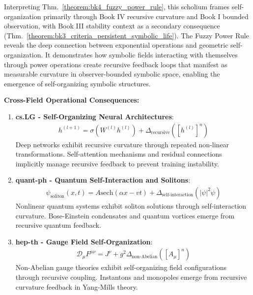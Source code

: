 \begin{scholium}
\label{scholium:bk4_symbolic_self_organization}
Interpreting Thm.~\ref{theorem:bk4_fuzzy_power_rule}, this scholium frames self-organization primarily through Book IV recursive curvature and Book I bounded observation, with Book III stability context as a secondary consequence (Thm.~\ref{theorem:bk3_criteria_persistent_symbolic_life}).
The Fuzzy Power Rule reveals the deep connection between exponential operations and geometric self-organization. It demonstrates how symbolic fields interacting with themselves through power operations create recursive feedback loops that manifest as measurable curvature in observer-bounded symbolic space, enabling the emergence of self-organizing symbolic structures.

\textbf{Cross-Field Operational Consequences:}

\begin{enumerate}
\item \textbf{cs.LG - Self-Organizing Neural Architectures}: 
   \begin{align}
   h^{(l+1)} = \sigma(W^{(l)} h^{(l)}) + \Delta_{\text{recursive}}([h^{(l)}]^n)
   \end{align}
   Deep networks exhibit recursive curvature through repeated non-linear transformations. Self-attention mechanisms and residual connections implicitly manage recursive feedback to prevent training instability.

\item \textbf{quant-ph - Quantum Self-Interaction and Solitons}:
   \begin{align}
   \psi_{\text{soliton}}(x,t) = A \text{sech}(\alpha x - vt) + \Delta_{\text{self-interaction}}(|\psi|^2\psi)
   \end{align}
   Nonlinear quantum systems exhibit soliton solutions through self-interaction curvature. Bose-Einstein condensates and quantum vortices emerge from recursive quantum feedback.

\item \textbf{hep-th - Gauge Field Self-Organization}:
   \begin{align}
   \mathcal{D}_\mu F^{\mu\nu} = J^\nu + g^2 \Delta_{\text{non-Abelian}}([A_\mu]^n)
   \end{align}
   Non-Abelian gauge theories exhibit self-organizing field configurations through recursive coupling. Instantons and monopoles emerge from recursive curvature feedback in Yang-Mills theory.


\end{enumerate}
\end{scholium}
